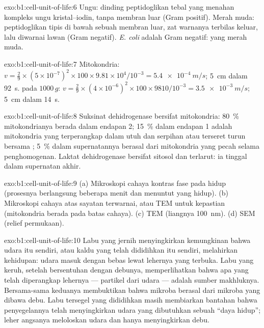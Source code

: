 \begin{solution}{exo:b1:cell-unit-of-life:6}
Ungu: dinding peptidoglikan tebal yang menahan kompleks ungu
kristal--iodin, tanpa membran luar (Gram positif). Merah muda:
peptidoglikan tipis di bawah sebuah membran luar, zat warnanya terbilas
keluar, lalu diwarnai lawan (Gram negatif). \emph{E. coli} adalah 
Gram negatif:  yang merah muda.
\end{solution}

\begin{solution}{exo:b1:cell-unit-of-life:7}
Mitokondria: $v = \frac{2}{9}\times(5\times 10^{-7})^2\times 100\times
9.81\times 10^4/10^{-3} = \qty{5.4e-4}{m/s}$; \qty{5}{cm} dalam
\qty{92}{s}.  pada $1000\,g$: $v = \frac{2}{9}\times(4\times
10^{-6})^2\times 100\times 9810/10^{-3} = \qty{3.5e-3}{m/s}$; \qty{5}{cm}
dalam \qty{14}{s}.
\end{solution}

\begin{solution}{exo:b1:cell-unit-of-life:8}
Suksinat dehidrogenase bersifat mitokondria: \qty{80}{\%} mitokondrianya
berada dalam endapan 2; \qty{15}{\%} dalam endapan 1 adalah mitokondria
yang terperangkap dalam  utuh dan serpihan atau terseret turun
bersama ; \qty{5}{\%} dalam supernatannya berasal dari
mitokondria yang pecah selama penghomogenan. Laktat dehidrogenase
bersifat sitosol dan terlarut: ia tinggal dalam supernatan akhir.
\end{solution}

\begin{solution}{exo:b1:cell-unit-of-life:9}
(a) Mikroskopi cahaya kontras fase pada  hidup (prosesnya berlangsung
beberapa menit dan menuntut  yang hidup). (b) Mikroskopi cahaya atas
sayatan terwarnai, atau TEM untuk kepastian (mitokondria berada pada
batas cahaya). (c) TEM (liangnya \qty{100}{nm}). (d) SEM (relief
permukaan).
\end{solution}

\begin{solution}{exo:b1:cell-unit-of-life:10}
Labu yang jernih menyingkirkan kemungkinan bahwa udara itu sendiri, atau
kaldu yang telah dididihkan itu sendiri, melahirkan kehidupan: udara
masuk dengan bebas lewat lehernya yang terbuka. Labu yang keruh, setelah
bersentuhan dengan debunya, memperlihatkan bahwa apa yang telah
diperangkap lehernya --- partikel dari udara --- adalah sumber
makhluknya. Bersama-sama keduanya membuktikan bahwa mikroba berasal dari
mikroba yang dibawa debu. Labu tersegel yang dididihkan masih membiarkan
bantahan bahwa penyegelannya telah menyingkirkan udara yang dibutuhkan
sebuah ``daya hidup''; leher angsanya meloloskan udara dan hanya
menyingkirkan debu.
\end{solution}

